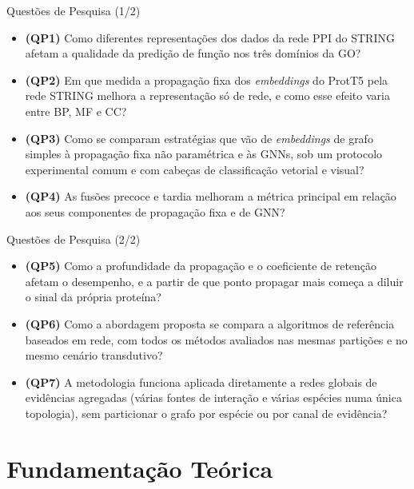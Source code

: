\documentclass[aspectratio=169,11pt]{beamer}
\begin{document}
\begin{frame}{Questões de Pesquisa (1/2)}
  \begin{itemize}\setlength{\itemsep}{0.7em}
    \item<+-> \textbf{(QP1)} Como diferentes representações dos dados da rede PPI do STRING afetam a qualidade da predição de função nos três domínios da GO?
    \item<+-> \textbf{(QP2)} Em que medida a propagação fixa dos \textit{embeddings} do ProtT5 pela rede STRING melhora a representação só de rede, e como esse efeito varia entre BP, MF e CC?
    \item<+-> \textbf{(QP3)} Como se comparam estratégias que vão de \textit{embeddings} de grafo simples à propagação fixa não paramétrica e às GNNs, sob um protocolo experimental comum e com cabeças de classificação vetorial e visual?
    \item<+-> \textbf{(QP4)} As fusões precoce e tardia melhoram a métrica principal em relação aos seus componentes de propagação fixa e de GNN?
  \end{itemize}
\end{frame}

\begin{frame}{Questões de Pesquisa (2/2)}
  \begin{itemize}\setlength{\itemsep}{0.7em}
    \item<+-> \textbf{(QP5)} Como a profundidade da propagação e o coeficiente de retenção afetam o desempenho, e a partir de que ponto propagar mais começa a diluir o sinal da própria proteína?
    \item<+-> \textbf{(QP6)} Como a abordagem proposta se compara a algoritmos de referência baseados em rede, com todos os métodos avaliados nas mesmas partições e no mesmo cenário transdutivo?
    \item<+-> \textbf{(QP7)} A metodologia funciona aplicada diretamente a redes globais de evidências agregadas (várias fontes de interação e várias espécies numa única topologia), sem particionar o grafo por espécie ou por canal de evidência?
  \end{itemize}
\end{frame}

\section{Fundamentação Teórica}
\end{document}
